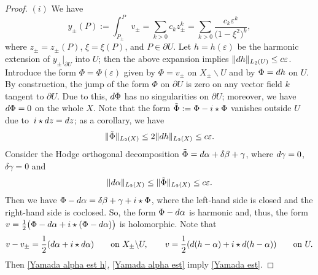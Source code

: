 \documentclass[10pt,a4paper]{amsart}
\begin{document}
\begin{proof}
$(i)$ We have
\begin{equation}
\label{Yamada y}
y_{\pm}(P):=\int_{P_\pm}^P v_\pm=\sum_{k>0}c_{k}z_\pm^{k}=\sum_{k>0}\frac{c_{k}\varepsilon^{k}}{\bigl(1-\xi^2\bigr)^k},
\end{equation}
where $z_\pm=z_\pm(P)$, $\xi=\xi(P)$, and $P\in \partial U$.
Let $h=h(\varepsilon)$ be the harmonic extension of $y_\pm|_{\partial U}$ into $U$; then the above expansion implies $\|{\rm d}h\|_{L_{2}(U)}\le c\varepsilon$. Introduce the form $\Phi=\Phi(\varepsilon)$ given by $\Phi=v_\pm$ on $X_\pm\backslash U$ and by $\Phi={\rm d}h$ on $U$. By construction, the jump of the form $\Phi$ on $\partial U$ is zero on any vector field $k$ tangent to $\partial U$. Due to this, ${\rm d}\Phi$ has no singularities on $\partial U$; moreover, we have ${\rm d}\Phi=0$ on the whole $X$. Note that the form $\tilde{\Phi}:=\Phi-{\rm i}\star\Phi$ vanishes outside $U$ due to~${{\rm i}\star {\rm d}z={\rm d}z}$; as a corollary, we have
\begin{equation}
\label{Yamada alpha est h}
\|\tilde{\Phi}\|_{L_2(X)}\le 2\|{\rm d}h\|_{L_2(X)}\le c\varepsilon.
\end{equation}
Consider the Hodge orthogonal decomposition $\tilde{\Phi}={\rm d}\alpha+\delta\beta+\gamma$, where ${\rm d}\gamma=0$, $\delta\gamma=0$ and
\begin{equation}
\label{Yamada alpha est}
\|{\rm d}\alpha\|_{L_2(X)}\le\|\tilde{\Phi}\|_{L_2(X)}\le c\varepsilon.
\end{equation}
Then we have
$\Phi-{\rm d}\alpha=\delta\beta+\gamma+{\rm i}\star\Phi$,
where the left-hand side is closed and the right-hand side is coclosed. So, the form $\Phi-{\rm d}\alpha$ is harmonic and, thus, the form
$v=\frac{1}{2}\bigl(\Phi-{\rm d}\alpha+{\rm i}\star(\Phi-{\rm d}\alpha)\bigr)$
is holomorphic. Note that
\[v-v_\pm=\frac{1}{2}({\rm d}\alpha+{\rm i}\star {\rm d}\alpha) \qquad\text{on}\ X_\pm\backslash U, \qquad v=\frac{1}{2}( d(h-\alpha)+{\rm i}\star d(h-\alpha)) \qquad\text{on}\ U.\]
Then \eqref{Yamada alpha est h}, \eqref{Yamada alpha est} imply \eqref{Yamada est}.


\end{proof}
\end{document}
